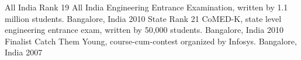 \begin{cvhonors}
  \cvhonor
    {All India Rank 19}
    {All India Engineering Entrance Examination, written by 1.1 million students.}
    {Bangalore, India}
    {2010}
  \cvhonor
    {State Rank 21}
    {CoMED-K, state level engineering entrance exam, written by 50,000 students.}
    {Bangalore, India}
    {2010}
  \cvhonor
    {Finalist}
    {Catch Them Young, course-cum-contest organized by Infosys.}
    {Bangalore, India}
    {2007}
\end{cvhonors}
